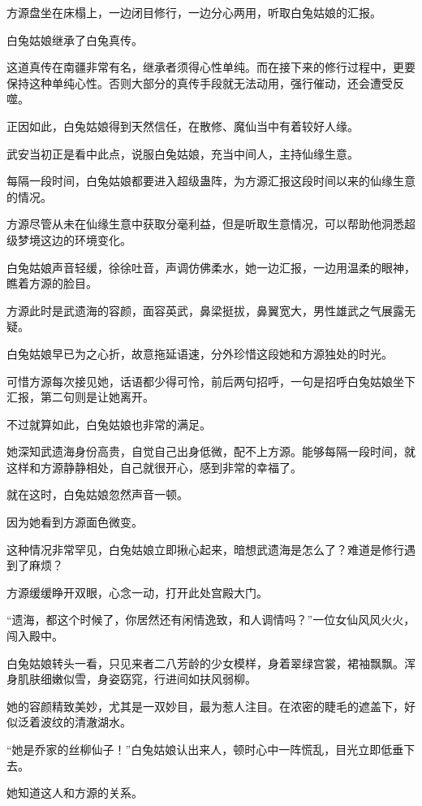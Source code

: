 \begin{this_body}
方源盘坐在床榻上，一边闭目修行，一边分心两用，听取白兔姑娘的汇报。

白兔姑娘继承了白兔真传。

这道真传在南疆非常有名，继承者须得心性单纯。而在接下来的修行过程中，更要保持这种单纯心性。否则大部分的真传手段就无法动用，强行催动，还会遭受反噬。

正因如此，白兔姑娘得到天然信任，在散修、魔仙当中有着较好人缘。

武安当初正是看中此点，说服白兔姑娘，充当中间人，主持仙缘生意。

每隔一段时间，白兔姑娘都要进入超级蛊阵，为方源汇报这段时间以来的仙缘生意的情况。

方源尽管从未在仙缘生意中获取分毫利益，但是听取生意情况，可以帮助他洞悉超级梦境这边的环境变化。

白兔姑娘声音轻缓，徐徐吐音，声调仿佛柔水，她一边汇报，一边用温柔的眼神，瞧着方源的脸目。

方源此时是武遗海的容颜，面容英武，鼻梁挺拔，鼻翼宽大，男性雄武之气展露无疑。

白兔姑娘早已为之心折，故意拖延语速，分外珍惜这段她和方源独处的时光。

可惜方源每次接见她，话语都少得可怜，前后两句招呼，一句是招呼白兔姑娘坐下汇报，第二句则是让她离开。

不过就算如此，白兔姑娘也非常的满足。

她深知武遗海身份高贵，自觉自己出身低微，配不上方源。能够每隔一段时间，就这样和方源静静相处，自己就很开心，感到非常的幸福了。

就在这时，白兔姑娘忽然声音一顿。

因为她看到方源面色微变。

这种情况非常罕见，白兔姑娘立即揪心起来，暗想武遗海是怎么了？难道是修行遇到了麻烦？

方源缓缓睁开双眼，心念一动，打开此处宫殿大门。

“遗海，都这个时候了，你居然还有闲情逸致，和人调情吗？”一位女仙风风火火，闯入殿中。

白兔姑娘转头一看，只见来者二八芳龄的少女模样，身着翠绿宫裳，裙袖飘飘。浑身肌肤细嫩似雪，身姿窈窕，行进间如扶风弱柳。

她的容颜精致美妙，尤其是一双妙目，最为惹人注目。在浓密的睫毛的遮盖下，好似泛着波纹的清澈湖水。

“她是乔家的丝柳仙子！”白兔姑娘认出来人，顿时心中一阵慌乱，目光立即低垂下去。

她知道这人和方源的关系。


\end{this_body}
